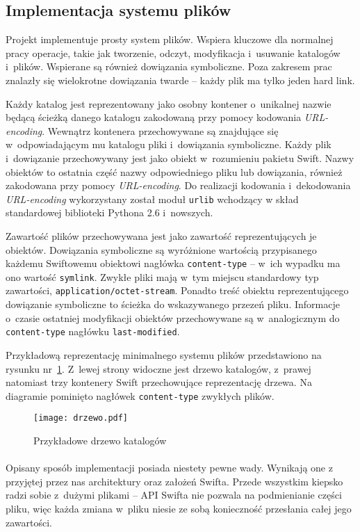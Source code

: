 \subsection{Implementacja systemu plików}

Projekt \cb{} implementuje prosty system plików. Wspiera kluczowe dla normalnej
pracy operacje, takie jak tworzenie, odczyt, modyfikacja i~usuwanie katalogów
i~plików. Wspierane są również dowiązania symboliczne. Poza zakresem prac
znalazły się wielokrotne dowiązania twarde -- każdy plik ma tylko jeden hard
link.

Każdy katalog jest reprezentowany jako osobny kontener o~unikalnej nazwie będącą
ścieżką danego katalogu zakodowaną przy pomocy kodowania \textit{URL-encoding}.
Wewnątrz kontenera przechowywane są znajdujące się w~odpowiadającym mu katalogu
pliki i~dowiązania symboliczne. Każdy plik i~dowiązanie przechowywany jest jako
obiekt w~rozumieniu pakietu Swift. Nazwy obiektów to ostatnia część nazwy
odpowiedniego pliku lub dowiązania, również zakodowana przy pomocy
\textit{URL-encoding}. Do realizacji kodowania i~dekodowania
\textit{URL-encoding} wykorzystany został moduł \texttt{urlib} wchodzący w skład
standardowej biblioteki Pythona 2.6 i~nowszych.

Zawartość plików przechowywana jest jako zawartość reprezentujących je obiektów.
Dowiązania symboliczne są wyróżnione wartością przypisanego każdemu Swiftowemu
obiektowi nagłówka \texttt{content-type} -- w~ich wypadku ma ono wartość
\texttt{symlink}. Zwykłe pliki mają w~tym miejscu standardowy typ zawartości,
\texttt{application/octet-stream}. Ponadto treść obiektu reprezentującego
dowiązanie symboliczne to ścieżka do wskazywanego przezeń pliku. Informacje
o~czasie ostatniej modyfikacji obiektów przechowywane są w~analogicznym do
\texttt{content-type} nagłówku \texttt{last-modified}.

Przykładową reprezentację minimalnego systemu plików przedstawiono na rysunku
nr~\ref{fig:drzewo}. Z~lewej strony widoczne jest drzewo katalogów, z~prawej
natomiast trzy kontenery Swift przechowujące reprezentację drzewa. Na diagramie
pominięto nagłówek \texttt{content-type} zwykłych plików.

\begin{figure}
    \centering
    \texttt{[image: drzewo.pdf]}
    \caption{Przykładowe drzewo katalogów}
	\label{fig:drzewo}
\end{figure}

\paragraph{}
Opisany sposób implementacji posiada niestety pewne wady. Wynikają one z
przyjętej przez nas architektury oraz założeń Swifta. Przede wszystkim \cb{}
kiepsko radzi sobie z~dużymi plikami -- API Swifta nie pozwala na podmienianie
części pliku, więc każda zmiana w~pliku niesie ze sobą konieczność przesłania
całej jego zawartości.

